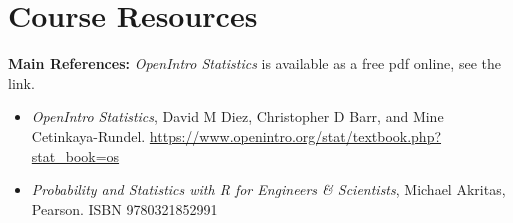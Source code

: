 \documentclass[11pt, a4paper]{article}
\begin{document}

\section{Course Resources}

\noindent\textbf{Main References:} %
\textit{OpenIntro Statistics} is available as a free pdf online, see the link.

\begin{itemize}
    \item \textit{OpenIntro Statistics}, David M Diez, Christopher D Barr, and Mine Cetinkaya-Rundel. \url{https://www.openintro.org/stat/textbook.php?stat_book=os}
    \item \textit{Probability and Statistics with R for Engineers \& Scientists}, Michael Akritas, Pearson. ISBN 9780321852991 
\end{itemize}
\end{document}
